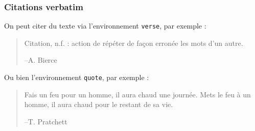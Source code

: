 \documentclass[10pt,    %
    french,             %
    xcolor=table,       %
    envcountsect,       %
    aspectratio=43      %
]{beamer}
\begin{document}
\begin{frame}
    \frametitle{Citations verbatim}
    
    \vspace{0.25cm}
    On peut citer du texte via l'environnement \texttt{verse}, par exemple :
    \begin{verse}
        Citation, n.f. : action de répéter de façon erronée les mots d’un autre. \\ 
        \vspace{-0.5cm}
        \begin{flushright}--A. Bierce\end{flushright}
    \end{verse}
    
    Ou bien l'environnement \texttt{quote}, par exemple :
    \begin{quote}
        Fais un feu pour un homme, il aura chaud une journée. Mets le feu à un homme, il aura chaud pour le restant de sa vie. \\ 
        \vspace{-0.5cm}
        \begin{flushright}--T. Pratchett\end{flushright}
    \end{quote}
\end{frame}
    
\end{document}
